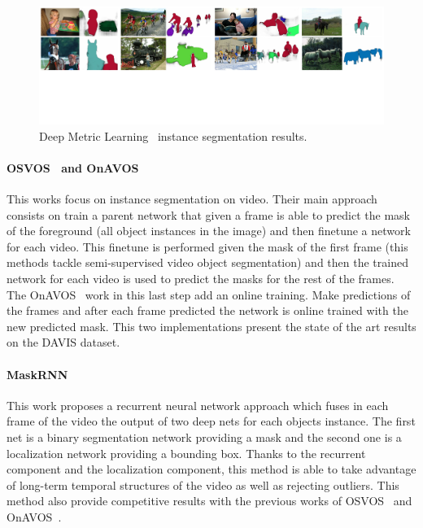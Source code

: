 \begin{figure}[h]
  \centering
  \includegraphics[width=1.\linewidth]{figures/deep_metric_learning/mask_classification.pdf}
  \caption{Deep Metric Learning~\cite{fathi2017semantic} instance segmentation results. }
  \label{fig:deep_metric_learning}
\end{figure}

\paragraph{OSVOS~\cite{caelles2017one} and OnAVOS~\cite{voigtlaender17BMVC}}
This works focus on instance segmentation on video.
Their main approach consists on train a parent network that given a frame is able to predict the mask of the foreground (all object instances in the image) and then finetune a network for each video.
This finetune is performed given the mask of the first frame (this methods tackle semi-supervised video object segmentation) and then the trained network for each video is used to predict the masks for the rest of the frames.
The OnAVOS~\cite{voigtlaender17BMVC} work in this last step add an online training. Make predictions of the frames and after each frame predicted the network is online trained with the new predicted mask.
This two implementations present the state of the art results on the DAVIS dataset.

\paragraph{MaskRNN~\cite{NIPS2017_6636}}
This work proposes a recurrent neural network approach which fuses in each frame of the video the output of two deep nets for each objects instance.
The first net is a binary segmentation network providing a mask and the second one is a localization network providing a bounding box.
Thanks to the recurrent component and the localization component, this method is able to take advantage of long-term temporal structures of the video as well as rejecting outliers.
This method also provide competitive results with the previous works of OSVOS~\cite{caelles2017one} and OnAVOS~\cite{voigtlaender17BMVC}.

